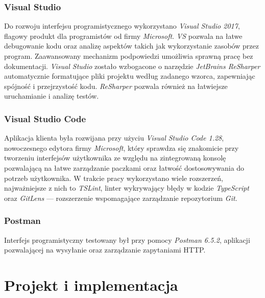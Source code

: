 \documentclass[eng,printmode,openany]{mgr}
\begin{document}
	\subsection{Visual Studio}
	Do rozwoju interfejsu programistycznego wykorzystano \textit{Visual Studio 2017}, flagowy produkt dla programistów od firmy \textit{Microsoft}. \textit{VS} pozwala na łatwe debugowanie kodu oraz analizę aspektów takich jak wykorzystanie zasobów przez program. Zaawansowany mechanizm podpowiedzi umożliwia sprawną pracę bez dokumentacji. \textit{Visual Studio} zostało wzbogacone o narzędzie \textit{JetBrains ReSharper} automatycznie formatujące pliki projektu według zadanego wzorca, zapewniając spójność i przejrzystość kodu. \textit{ReSharper} pozwala również na łatwiejsze uruchamianie i analizę testów.
	
	\subsection{Visual Studio Code}
	Aplikacja klienta była rozwijana przy użyciu \textit{Visual Studio Code 1.28}, nowoczesnego edytora firmy \textit{Microsoft}, który sprawdza się znakomicie przy tworzeniu interfejsów użytkownika ze względu na zintegrowaną konsolę pozwalającą na łatwe zarządzanie paczkami oraz łatwość dostosowywania do potrzeb użytkownika. W trakcie pracy wykorzystano wiele rozszerzeń, najważniejsze z nich to \textit{TSLint}, linter wykrywający błędy w kodzie \textit{TypeScript} oraz \textit{GitLens} — rozszerzenie wspomagające zarządzanie repozytorium \textit{Git}.
	

	\subsection{Postman}
	Interfejs programistyczny testowany był przy pomocy \textit{Postman 6.5.2}, aplikacji pozwalającej na wysyłanie oraz zarządzanie zapytaniami HTTP.
	
	\newpage
	\chapter{Projekt i implementacja}
\end{document}
